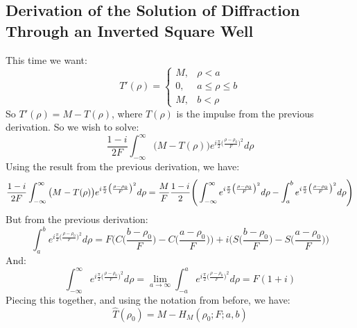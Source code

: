 \documentclass[oneside]{book}
\theoremstyle{mystyle}
\begin{document}
\subsection{Derivation of the Solution of Diffraction Through an Inverted Square Well}
This time we want:
\begin{equation*}
    T'(\rho) = \begin{cases} M, & \rho<a \\ 0, & a\leq \rho \leq b \\ M, & b<\rho\end{cases}    
\end{equation*}
So $T'(\rho) = M - T(\rho)$, where $T(\rho)$ is the impulse from the previous derivation. So we wish to solve:
\begin{equation*}
\frac{1-i}{2F}\int_{-\infty}^{\infty}\big(M-T(\rho)\big)e^{i\frac{\pi}{2}\big(\frac{\rho-\rho_0}{F}\big)^2}d\rho
\end{equation*}
Using the result from the previous derivation, we have:
\begin{equation*}
\frac{1-i}{2F}\int_{-\infty}^{\infty}\big(M-T(\rho)\big)e^{i\frac{\pi}{2}\big(\frac{\rho-\rho_0}{F}\big)^2}d\rho = \frac{M}{F}\frac{1-i}{2}\Bigg(\int_{-\infty}^{\infty}e^{i\frac{\pi}{2}\big(\frac{\rho-\rho_0}{F}\big)^2}d\rho - \int_{a}^{b}e^{i\frac{\pi}{2}\big(\frac{\rho-\rho_0}{F}\big)^2}d\rho\Bigg)\\
\end{equation*}
But from the previous derivation:
\begin{equation*}
    \int_{a}^{b}e^{i\frac{\pi}{2}\big(\frac{\rho-\rho_0}{F}\big)^{2}}d\rho = F\bigg(C\big(\frac{b-\rho_0}{F}\big)-C\big(\frac{a-\rho_0}{F}\big)\bigg)+i\bigg(S\big(\frac{b-\rho_0}{F}\big)-S\big(\frac{a-\rho_0}{F}\big)\bigg)
\end{equation*}
And:
\begin{equation*}
    \int_{-\infty}^{\infty}e^{i\frac{\pi}{2}\big(\frac{\rho-\rho_0}{F}\big)^{2}}d\rho = \underset{a\rightarrow \infty}{\lim} \int_{-a}^{a}e^{i\frac{\pi}{2}\big(\frac{\rho-\rho_0}{F}\big)^{2}}d\rho = F(1+i)
\end{equation*}
Piecing this together, and using the notation from before, we have:
\begin{equation*}
\hat{T}(\rho_0) = M-H_{M}(\rho_0;F;a,b)
\end{equation*}
\end{document}
